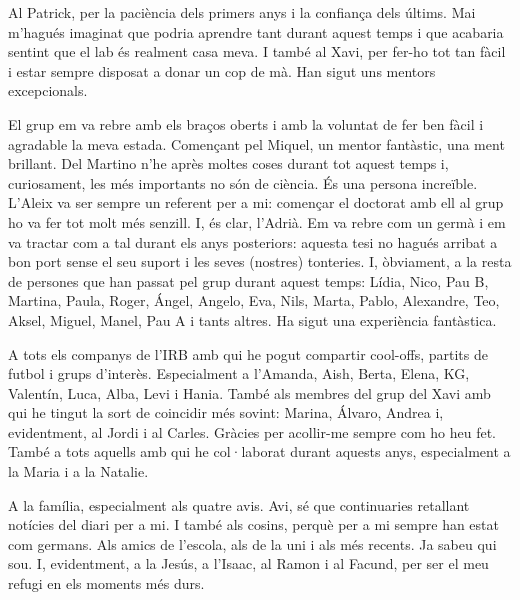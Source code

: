 

Al Patrick, per la paciència dels primers anys i la confiança dels últims. Mai m’hagués imaginat que podria aprendre tant durant aquest temps i que acabaria sentint que el lab és realment casa meva. I també al Xavi, per fer-ho tot tan fàcil i estar sempre disposat a donar un cop de mà. Han sigut uns mentors excepcionals.

El grup em va rebre amb els braços oberts i amb la voluntat de fer ben fàcil i agradable la meva estada. Començant pel Miquel, un mentor fantàstic, una ment brillant. Del Martino n’he après moltes coses durant tot aquest temps i, curiosament, les més importants no són de ciència. És una persona increïble. L’Aleix va ser sempre un referent per a mi: començar el doctorat amb ell al grup ho va fer tot molt més senzill. I, és clar, l’Adrià. Em va rebre com un germà i em va tractar com a tal durant els anys posteriors: aquesta tesi no hagués arribat a bon port sense el seu suport i les seves (nostres) tonteries. I, òbviament, a la resta de persones que han passat pel grup durant aquest temps: Lídia, Nico, Pau B, Martina, Paula, Roger, Ángel, Angelo, Eva, Nils, Marta, Pablo, Alexandre, Teo, Aksel, Miguel, Manel, Pau A i tants altres. Ha sigut una experiència fantàstica. 

A tots els companys de l’IRB amb qui he pogut compartir cool-offs, partits de futbol i grups d’interès. Especialment a l’Amanda, Aish, Berta, Elena, KG, Valentín, Luca, Alba, Levi i Hania. També als membres del grup del Xavi amb qui he tingut la sort de coincidir més sovint: Marina, Álvaro, Andrea i, evidentment, al Jordi i al Carles. Gràcies per acollir-me sempre com ho heu fet. També a tots aquells amb qui he col·laborat durant aquests anys, especialment a la Maria i a la Natalie. 

A la família, especialment als quatre avis. Avi, sé que continuaries retallant notícies del diari per a mi. I també als cosins, perquè per a mi sempre han estat com germans. Als amics de l’escola, als de la uni i als més recents. Ja sabeu qui sou. I, evidentment, a la Jesús, a l’Isaac, al Ramon i al Facund, per ser el meu refugi en els moments més durs.

